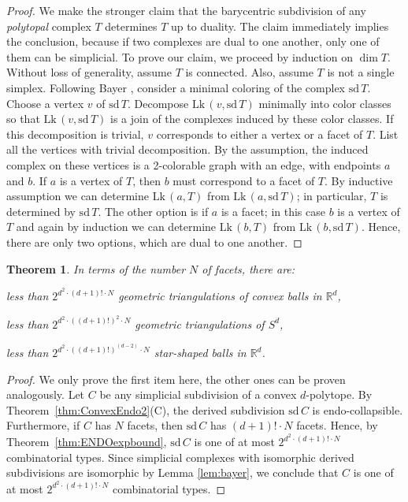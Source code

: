 \documentclass[a4paper,11pt]{article}
\theoremstyle{plain}
\newtheorem{theorem}{\bf Theorem}[section]
\theoremstyle{definition}
\newcommand{\R}{\mathbb{R}}
\newcommand{\Lk}{\mathrm{Lk}\, }
\newcommand{\sd}{\mathrm{sd}\, }
\begin{document}
\begin{proof} We make the stronger claim that the barycentric subdivision of any \emph{polytopal} complex $T$ determines $T$ up to duality. The claim immediately implies the conclusion, because if two complexes are dual to one another, only one of them can be simplicial. To prove our claim, we proceed by induction on $\dim T$. Without loss of generality, assume $T$ is connected. Also, assume $T$ is not a single simplex. Following Bayer \cite{Bayer}, consider a minimal coloring of the complex $\sd T$. Choose a vertex $v$ of $\sd T$. Decompose $\Lk(v, \sd T)$ minimally into color classes so that $\Lk(v,\sd T)$ is a join of the complexes induced by these color classes. If this decomposition is trivial, $v$ corresponds to either a vertex or a facet of $T$. %
List all the vertices with trivial decomposition. By the assumption, the induced complex on these vertices is a 
2-colorable graph with an edge, with endpoints $a$ and $b$. If $a$ is a 
vertex of $T$, then $b$ must correspond to a facet of $T$. By inductive assumption we can determine $\Lk(a,T)$ from $\Lk(a,\sd T)$; in particular, $T$ is determined by $\sd T$. The other option is if $a$ is a facet; in this case $b$ is a vertex of $T$ and again by induction we can determine $\Lk(b,T)$ from $\Lk(b,\sd T)$. Hence, there are only two options, which 
are dual to one another.
\end{proof}

\begin{theorem}\label{thm:stbound} In terms of the number $N$ of facets, there are: \begin{compactitem}[$\bullet$]
\item less than $2^{d^2\cdot (d+1)! \cdot N}$ geometric triangulations of convex balls in $\R^d$,
\item less than $2^{d^2\cdot ((d+1)!)^2 \cdot N}$ geometric triangulations of $S^d$, 
\item less than $2^{d^2\cdot ((d+1)!)^{(d-2)} \cdot N}$ star-shaped balls in $\R^d$.
\end{compactitem}
\end{theorem}


\begin{proof}
We only prove the first item here, the other ones can be proven analogously. Let $C$ be any simplicial subdivision of a convex $d$-polytope. By Theorem~\ref{thm:ConvexEndo2}(C), the derived subdivision $\sd C$ is endo-collapsible. Furthermore, if $C$ has $N$ facets, then $\sd C$ has $(d+1)!\cdot N$ facets. Hence, by Theorem~\ref{thm:ENDOexpbound}, $\sd C$ is one of at most $2^{d^2\cdot (d+1)! \cdot N}$ combinatorial types. Since  simplicial complexes with isomorphic derived subdivisions are isomorphic by Lemma \ref{lem:bayer}, we conclude that $C$ is one of at most $2^{d^2\cdot (d+1)! \cdot N}$ combinatorial types.
\end{proof}
\end{document}
